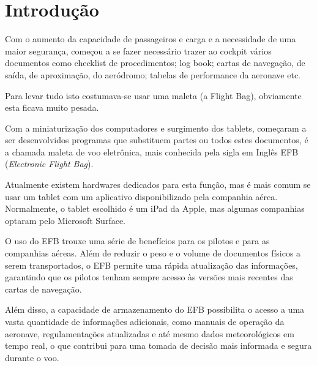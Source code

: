 \chapter{Introdução}
Com o aumento da capacidade de passageiros e carga e a necessidade 
de uma maior segurança, começou a se fazer necessário trazer ao cockpit 
vários documentos como checklist de procedimentos; log book; cartas de 
navegação, de saída, de aproximação, do aeródromo; tabelas de performance
 da aeronave etc.

Para levar tudo isto costumava-se usar uma maleta (a Flight Bag), 
obviamente esta ficava muito pesada.

Com a miniaturização dos computadores e surgimento dos tablets, 
começaram a ser desenvolvidos programas que substituem partes ou 
todos estes documentos, é a chamada maleta de voo eletrônica, mais 
conhecida pela sigla em Inglês EFB (\textit{Electronic Flight Bag}).

Atualmente existem hardwares dedicados para esta função, mas é mais 
comum se usar um tablet com um aplicativo disponibilizado pela companhia aérea.
Normalmente, o tablet escolhido é um iPad da Apple, mas algumas companhias
optaram pelo Microsoft Surface. \cite{surface}

O uso do EFB trouxe uma série de benefícios para os pilotos e para as 
companhias aéreas. Além de reduzir o peso e o volume de documentos físicos 
a serem transportados, o EFB permite uma rápida atualização das informações, 
garantindo que os pilotos tenham sempre acesso às versões mais recentes das 
cartas de navegação. \cite{EFB-more-than}

Além disso, a capacidade de armazenamento do EFB possibilita o acesso a uma 
vasta quantidade de informações adicionais, como manuais de operação da aeronave, 
regulamentações atualizadas e até mesmo dados meteorológicos em tempo real, 
o que contribui para uma tomada de decisão mais informada e segura durante o voo.
